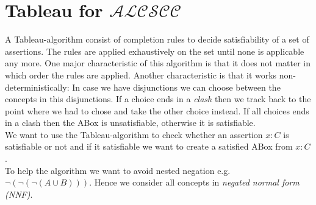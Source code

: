\documentclass[a4paper,11pt]{scrartcl}
\theoremstyle{break}
\theoremstyle{definition}
\begin{document}
\section{Tableau for $\mathcal{ALCSCC}$}
A Tableau-algorithm consist of completion rules to decide satisfiability of a set of assertions. The rules are applied exhaustively on the set until none is applicable any more. One major characteristic of this algorithm is that it does not matter in which order the rules are applied. Another characteristic is that it works non-deterministically: In case we have disjunctions we can choose between the concepts in this disjunctions. If a choice ends in a \textit{clash} then we track back to the point where we had to chose and take the other choice instead. If all choices ends in a clash then the ABox is unsatisfiable, otherwise it is satisfiable.\\
We want to use the Tableau-algorithm to check whether an assertion $x:C$ is satisfiable or not and if it satisfiable we want to create a satisfied ABox from $x:C$.\\
To help the algorithm we want to avoid nested negation e.g. $\neg(\neg(\neg(A\cup B)))$. Hence we consider all concepts in \textit{negated normal form (NNF)}.
\end{document}
